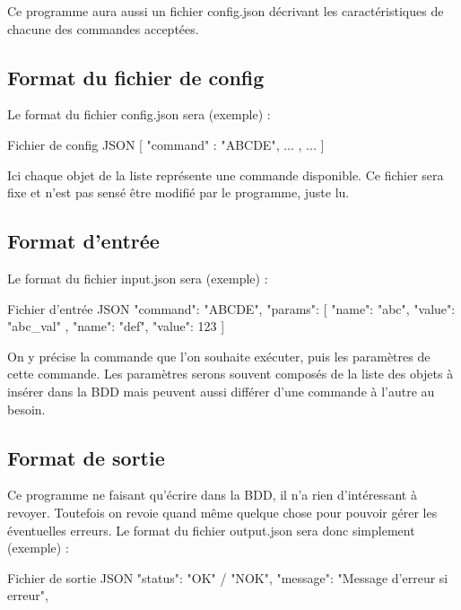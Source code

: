 Ce programme aura aussi un fichier config.json décrivant les caractéristiques de chacune des commandes acceptées.

\subsection{Format du fichier de config}

Le format du fichier config.json sera (exemple) :

\begin{Python}{Fichier de config JSON}
    [
        {
            "command" : "ABCDE",
            ...
        },
        { ... }
    ]
\end{Python}
	
Ici chaque objet de la liste représente une commande disponible.
Ce fichier sera fixe et n'est pas sensé être modifié par le programme, juste lu.

\subsection{Format d'entrée}

Le format du fichier input.json sera (exemple) :

\begin{Python}{Fichier d'entrée JSON}
    {
        "command":  "ABCDE",
        "params":  [
            { "name": "abc", "value": "abc_val" },
            { "name": "def", "value": 123 }
        ]
    }
\end{Python}

On y précise la commande que l'on souhaite exécuter, puis les paramètres de cette commande. Les paramètres serons souvent composés de la liste des objets à insérer dans la BDD mais peuvent aussi différer d'une commande à l'autre au besoin.

\subsection{Format de sortie}

Ce programme ne faisant qu’écrire dans la BDD, il n’a rien d’intéressant à revoyer. Toutefois on revoie quand même quelque chose pour pouvoir gérer les éventuelles erreurs. Le format du fichier output.json sera donc simplement (exemple) :

\begin{Python}{Fichier de sortie JSON}
    {
        "status": "OK" / "NOK",
        "message": "Message d’erreur si erreur",
    }
\end{Python}



